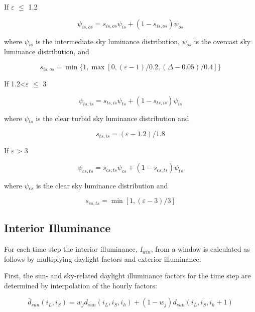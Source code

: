 If \emph{$\varepsilon$} $≤$ 1.2

\begin{equation}
{\psi_{is,os}} = {s_{is,os}}{\psi_{is}} + (1 - {s_{is,os}}){\psi_{os}}
\end{equation}

where \emph{$\psi$\(_{is}\)} is the intermediate sky luminance distribution, \emph{$\psi$\(_{os}\)} is the overcast sky luminance distribution, and

\begin{equation}
{s_{is,os}} = \min \{ 1,\max [0,(\varepsilon  - 1)/0.2,(\Delta  - 0.05)/0.4]\}
\end{equation}

If 1.2\textless{}\emph{$\varepsilon$} $≤$ 3

\begin{equation}
{\psi_{ts,is}} = {s_{ts,is}}{\psi_{ts}} + (1 - {s_{ts,is}}){\psi_{is}}
\end{equation}

where \emph{$\psi$\(_{ts}\)} is the clear turbid sky luminance distribution and

\begin{equation}
{s_{ts,is}} = (\varepsilon  - 1.2)/1.8
\end{equation}

If \emph{$\varepsilon$} \textgreater{} 3

\begin{equation}
{\psi_{cs,ts}} = {s_{cs,ts}}{\psi_{cs}} + (1 - {s_{cs,ts}}){\psi_{ts}}
\end{equation}

where \emph{$\psi$\(_{cs}\)} is the clear sky luminance distribution and

\begin{equation}
{s_{cs,ts}} = \min [1,(\varepsilon  - 3)/3]
\end{equation}

\subsection{Interior Illuminance}\label{interior-illuminance}

For each time step the interior illuminance, \emph{I\(_{win}\)}, from a window is calculated as follows by multiplying daylight factors and exterior illuminance.

First, the sun- and sky-related daylight illuminance factors for the time step are determined by interpolation of the hourly factors:

\begin{equation}
{\bar d_{sun}}({i_L},{i_S}) = {w_j}{d_{sun}}({i_L},{i_S},{i_h}) + (1 - {w_j}){d_{sun}}({i_L},{i_S},{i_h} + 1)
\end{equation}

